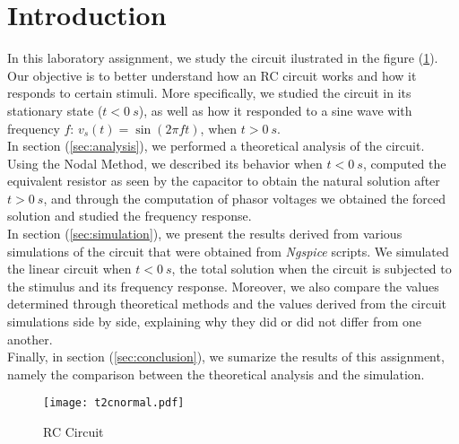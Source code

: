 \clearpage

\section{Introduction}
\label{sec:introduction}

In this laboratory assignment, we study the circuit ilustrated in the figure (\ref{fig:1}).
Our objective is to better understand how an RC circuit works and how it responds to certain stimuli.
More specifically, we studied the circuit in its stationary state ($t < 0 \: s$), as well as how it
responded to a sine wave with frequency $f$: $v_s(t) = \sin(2 \pi f t)$, when $t > 0 \: s$.
\\
In section (\ref{sec:analysis}), we performed a theoretical analysis of the circuit.
Using the Nodal Method, we described its behavior when $t < 0 \: s$, computed the equivalent
resistor as seen by the capacitor to obtain the natural solution after $t > 0 \: s$,
and through the computation of phasor voltages we obtained the forced solution and studied
the frequency response.
\\
In section (\ref{sec:simulation}), we present the results derived from various simulations of the circuit
that were obtained from \emph{Ngspice} scripts. We simulated the linear circuit when $t < 0 \: s$, the total solution
when the circuit is subjected to the stimulus and its frequency response.
Moreover, we also compare the values determined through theoretical methods and the values derived from
the circuit simulations side by side, explaining why they did or did not differ from one another.
\\
Finally, in section (\ref{sec:conclusion}), we sumarize the results of this assignment, namely the
comparison between the theoretical analysis and the simulation.

\begin{figure}[H] \centering
    \texttt{[image: t2cnormal.pdf]}
    \caption{RC Circuit}
    \label{fig:1}
\end{figure}